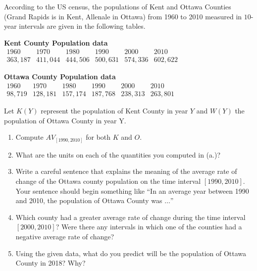 \documentclass[nooutcomes]{ximera}
\begin{document}
\begin{exploration}
According to the US census, the populations of Kent and Ottawa Counties (Grand Rapids is in Kent, Allenale in Ottawa) from 1960 to 2010 measured in \(10\)-year intervals are given in the following tables.

\begin{center}

\textbf{Kent County Population data}
\(
\begin{array}{llllll}
1960&1970&1980&1990&2000&2010\\
\hline
363,187&411,044&444,506&500,631&574,336&602,622
\end{array}
\)

\vspace{.2in}

\textbf{Ottawa County Population data}
\(
\begin{array}{llllll}
1960&1970&1980&1990&2000&2010\\
\hline
98,719&128,181&157,174&187,768&238,313&263,801
\end{array}
\)
\end{center}

Let \(K(Y)\) represent the population of Kent County in year \(Y\) and \(W(Y)\) the population of Ottawa County in year Y.
\begin{enumerate}[label=\alph*.]
\item Compute \(AV_{[1990,2010]}\) for both \(K\) and \(O\).
\item What are the units on each of the quantities you computed in (a.)?
\item Write a careful sentence that explains the meaning of the average rate of change of the Ottawa county population on the time interval \([1990,2010]\).  Your sentence should begin something like ``In an average year between 1990 and 2010, the population of Ottawa County was \(\ldots\)''
\item Which county had a greater average rate of change during the time interval \([2000,2010]\)? Were there any intervals in which one of the counties had a negative average rate of change?
\item Using the given data, what do you predict will be the population of Ottawa County in 2018? Why?
\end{enumerate}
\end{exploration}
\end{document}
